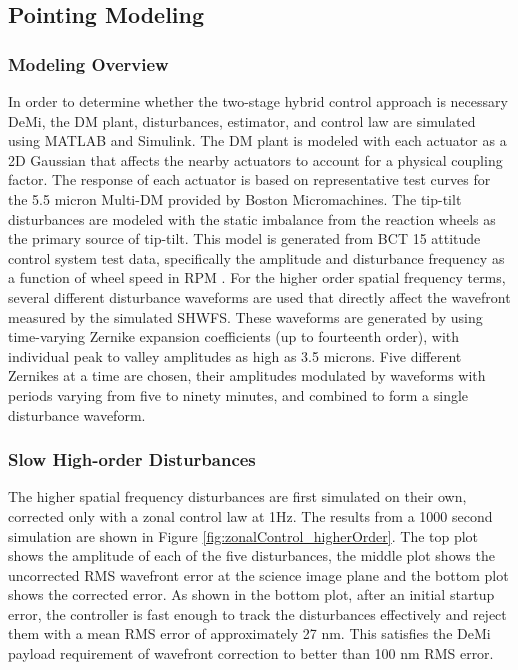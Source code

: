 \documentclass[]{spie}  %
\begin{document}
\subsection{Pointing Modeling}%
\label{sec:pointing_modeling}
\subsubsection{Modeling Overview}
In order to determine whether the two-stage hybrid control approach is necessary DeMi, the DM plant, disturbances, estimator, and control law are simulated using MATLAB and Simulink.  The DM plant is modeled with each actuator as a 2D Gaussian that affects the nearby actuators to account for a physical coupling factor.  The response of each actuator is based on representative test curves for the 5.5 micron Multi-DM provided by Boston Micromachines. The tip-tilt disturbances are modeled with the static imbalance from the reaction wheels as the primary source of tip-tilt.  This model is generated from BCT 15 attitude control system test data, specifically the amplitude and disturbance frequency as a function of wheel speed in RPM \cite{shields_characterization_2017}. For the higher order spatial frequency terms, several different disturbance waveforms are used that directly affect the wavefront measured by the simulated SHWFS.  These waveforms are generated by using time-varying Zernike expansion coefficients (up to fourteenth order), with individual peak to valley amplitudes as high as 3.5 microns.  Five different Zernikes at a time are chosen, their amplitudes modulated by waveforms with periods varying from five to ninety minutes, and combined to form a single disturbance waveform.
\subsubsection{Slow High-order Disturbances}
The higher spatial frequency disturbances are first simulated on their own, corrected only with a zonal control law at 1Hz.  The results from a 1000 second simulation are shown in Figure \ref{fig:zonalControl_higherOrder}.  The top plot shows the amplitude of each of the five disturbances, the middle plot shows the uncorrected RMS wavefront error at the science image plane and the bottom plot shows the corrected error. As shown in the bottom plot, after an initial startup error, the controller is fast enough to track the disturbances effectively and reject them with a mean RMS error of approximately 27 nm. This satisfies the DeMi payload requirement of wavefront correction to better than 100 nm RMS error.
 
\end{document}
